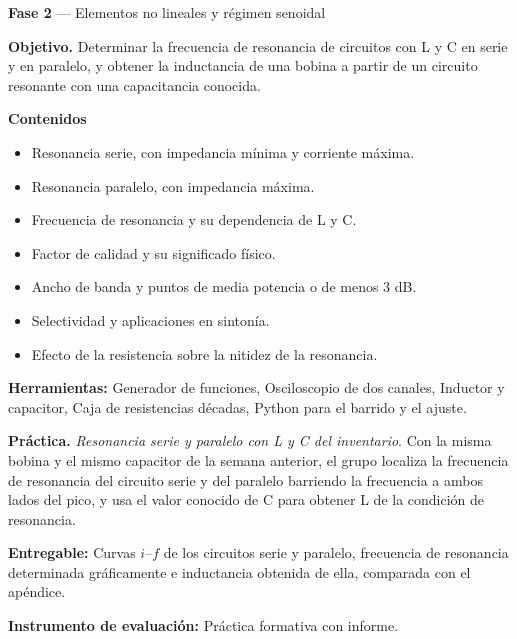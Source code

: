 \documentclass[11pt,a4paper]{article}
\begin{document}
\begin{tcolorbox}[cajaContenido,title={Semana 7 --- Circuitos resonantes serie y paralelo}]
\textbf{Fase 2} --- Elementos no lineales y régimen senoidal

\textbf{Objetivo.} Determinar la frecuencia de resonancia de circuitos con L y C en serie y en paralelo, y obtener la inductancia de una bobina a partir de un circuito resonante con una capacitancia conocida.

\textbf{Contenidos}

\begin{itemize}[leftmargin=1.4em,itemsep=2pt,topsep=3pt]
  \item Resonancia serie, con impedancia mínima y corriente máxima.
  \item Resonancia paralelo, con impedancia máxima.
  \item Frecuencia de resonancia y su dependencia de L y C.
  \item Factor de calidad y su significado físico.
  \item Ancho de banda y puntos de media potencia o de menos 3 dB.
  \item Selectividad y aplicaciones en sintonía.
  \item Efecto de la resistencia sobre la nitidez de la resonancia.
\end{itemize}

\textbf{Herramientas:} Generador de funciones, Osciloscopio de dos canales, Inductor y capacitor, Caja de resistencias décadas, Python para el barrido y el ajuste.

\textbf{Práctica.} \emph{Resonancia serie y paralelo con L y C del inventario}. Con la misma bobina y el mismo capacitor de la semana anterior, el grupo localiza la frecuencia de resonancia del circuito serie y del paralelo barriendo la frecuencia a ambos lados del pico, y usa el valor conocido de C para obtener L de la condición de resonancia.

\textbf{Entregable:} Curvas $i$--$f$ de los circuitos serie y paralelo, frecuencia de resonancia determinada gráficamente e inductancia obtenida de ella, comparada con el apéndice.

\textbf{Instrumento de evaluación:} Práctica formativa con informe.
\end{tcolorbox}
\end{document}
